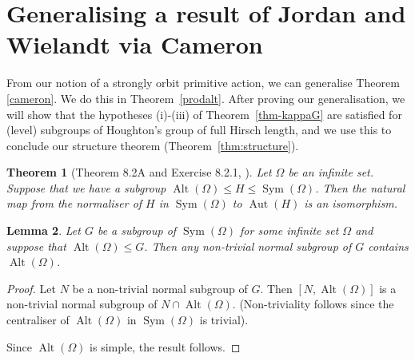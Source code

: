 \documentclass[11pt,a4paper]{amsart}
\newtheorem{theorem}{Theorem}[section]
\newtheorem{lemma}[theorem]{Lemma}
\theoremstyle{definition}
\theoremstyle{remark}
\newcommand{\Sym}{\operatorname{Sym}}
\newcommand{\Alt}{\operatorname{Alt}}
\newcommand{\Aut}{\operatorname{Aut}}
\begin{document}
\section{Generalising a result of Jordan and Wielandt via Cameron}\label{sec:cameron}
From our notion of a strongly orbit primitive action, we can generalise Theorem \ref{cameron}. We do this in Theorem~\ref{prodalt}. After proving our generalisation, we will  show that the hypotheses (i)-(iii) of Theorem~\ref{thm-kappaG} are satisfied for (level) subgroups of Houghton's group of full Hirsch length, and we use this to conclude our structure theorem (Theorem~\ref{thm:structure}).

\begin{theorem}[Theorem 8.2A and Exercise 8.2.1, \cite{DixonMortimerPG}]
	\label{autos of perm groups}
	Let $\Omega$ be an infinite set. Suppose that we have a subgroup  $\Alt(\Omega) \leq H \leq \Sym(\Omega)$. Then the natural map from the normaliser of $H$ in $\Sym(\Omega)$ to $\Aut(H)$ is an isomorphism. 
\end{theorem}




\begin{lemma}
	\label{normal subs of perm groups}
	Let $G$ be a subgroup of $\Sym(\Omega)$ for some infinite set $\Omega$ and suppose that $\Alt(\Omega) \leq G$. Then any non-trivial normal subgroup of $G$ contains $\Alt(\Omega)$.
\end{lemma}
\begin{proof}
	Let $N$ be a non-trivial normal subgroup of $G$. Then $[N, \Alt(\Omega)]$ is a non-trivial normal subgroup of $N \cap \Alt(\Omega)$. (Non-triviality follows since the centraliser of $\Alt(\Omega)$ in $\Sym(\Omega)$ is trivial). 
	
	Since $\Alt(\Omega)$ is simple, the result follows.
\end{proof}
\end{document}
